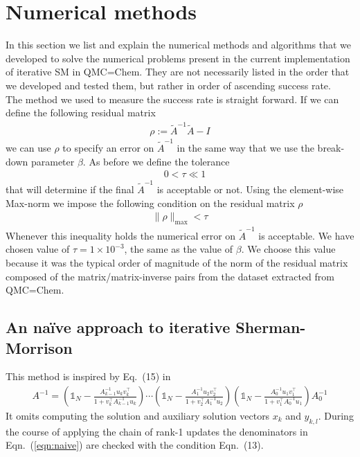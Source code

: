\documentclass[11pt]{article}
\numberwithin{figure}{section}
\numberwithin{table}{section}
\begin{document}
		
  \section{Numerical methods}\label{sec:num_opt}
		
		In this section we list and explain the numerical methods and algorithms that we developed to solve the numerical problems present in the current implementation of iterative SM in QMC=Chem. They are not necessarily listed in the order that we developed and tested them, but rather in order of ascending success rate.\\
		
		The method we used to measure the success rate is straight forward. If we can define the following residual matrix
			\begin{align} \label{cond:singular}
				\rho := \widetilde{A}^{-1}\widetilde{A} - I
			\end{align}
			we can use $\rho$ to specify an error on $\widetilde{A}^{-1}$ in the same way that we use the break-down parameter $\beta$. As before we define the tolerance 
			\begin{align}\label{eqn:tolerance}
				\quad 0 < \tau \ll 1
			\end{align}
			that will determine if the final $\widetilde{A}^{-1}$ is acceptable or not. Using the element-wise Max-norm we impose the following condition on the residual matrix $\rho$
			\begin{align}\label{eqn:acceptance-condition}
				\|\rho\|_\mathrm{max} < \tau
			\end{align}
			Whenever this inequality holds the numerical error on $\widetilde{A}^{-1}$ is acceptable. We have chosen value of $\tau = 1\times 10^{-3}$, the same as the value of $\beta$. We choose this value because it was the typical order of magnitude of the norm of the residual matrix composed of the matrix/matrix-inverse pairs from the dataset extracted from QMC=Chem.
		
			\subsection{An na\"{i}ve approach to iterative Sherman-Morrison}\label{sec:naive}
				This method is inspired by Eq.~(15) in \cite{MAPONI2007276}
				\begin{align}\label{eqn:naive}
					A^{-1} =
		\left(\mathbb{1}_N-\frac{A_{k-1}^{-1}u_kv_k^\top}{1+v_k^\top A_{k-1}^{-1}u_k}\right)
		\cdots
		\left(\mathbb{1}_N-\frac{A_1^{-1}u_2v_2^\top }{1+v_2^\top A_1^{-1}u_2}\right)
		\left(\mathbb{1}_N-\frac{A_0^{-1}u_1v_1^\top }{1+v_1^\top A_0^{-1}u_1}\right)
		A_0^{-1}
				\end{align}
				It omits computing the solution and auxiliary solution vectors $x_k$ and $y_{k,l}$. During the course of applying the chain of rank-1 updates the denominators in Eqn.~(\ref{eqn:naive}) are checked with the condition Eqn.~(13).\\
	
\end{document}
